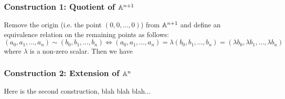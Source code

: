 \subsubsection{Construction 1: Quotient of $\an[n+1]$}
Remove the origin (i.e. the point $(0,0,\ldots,0)$) from $\an[n+1]$ and define an equivalence relation on the remaining points as follows:
$$(a_0,a_1,\ldots,a_n) \sim (b_0,b_1,\ldots,b_n) \iff (a_0,a_1,\ldots,a_n) = \lambda(b_0,b_1,\ldots,b_n) = (\lambda b_0,\lambda b_1,\ldots,\lambda b_n)$$
where $\lambda$ is a non-zero scalar.
Then we have 

\subsubsection{Construction 2: Extension of $\an[n]$}
Here is the second construction, blah blah blah...
\lipsum[1-2]
